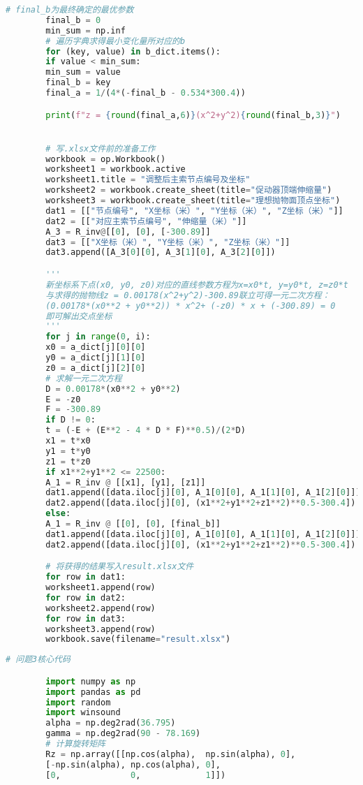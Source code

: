 \documentclass{myclass}
\begin{document}
\begin{appendices}
\begin{lstlisting}[language={python}]
		# final_b为最终确定的最优参数
		final_b = 0
		min_sum = np.inf
		# 遍历字典求得最小变化量所对应的b
		for (key, value) in b_dict.items():
		if value < min_sum:
		min_sum = value
		final_b = key
		final_a = 1/(4*(-final_b - 0.534*300.4))

		print(f"z = {round(final_a,6)}(x^2+y^2){round(final_b,3)}")


		# 写.xlsx文件前的准备工作
		workbook = op.Workbook()
		worksheet1 = workbook.active
		worksheet1.title = "调整后主索节点编号及坐标"
		worksheet2 = workbook.create_sheet(title="促动器顶端伸缩量")
		worksheet3 = workbook.create_sheet(title="理想抛物面顶点坐标")
		dat1 = [["节点编号", "X坐标（米）", "Y坐标（米）", "Z坐标（米）"]]
		dat2 = [["对应主索节点编号", "伸缩量（米）"]]
		A_3 = R_inv@[[0], [0], [-300.89]]
		dat3 = [["X坐标（米）", "Y坐标（米）", "Z坐标（米）"]]
		dat3.append([A_3[0][0], A_3[1][0], A_3[2][0]])

		'''
		新坐标系下点(x0, y0, z0)对应的直线参数方程为x=x0*t, y=y0*t, z=z0*t
		与求得的抛物线z = 0.00178(x^2+y^2)-300.89联立可得一元二次方程：
		(0.00178*(x0**2 + y0**2)) * x^2+ (-z0) * x + (-300.89) = 0
		即可解出交点坐标
		'''
		for j in range(0, i):
		x0 = a_dict[j][0][0]
		y0 = a_dict[j][1][0]
		z0 = a_dict[j][2][0]
		# 求解一元二次方程
		D = 0.00178*(x0**2 + y0**2)
		E = -z0
		F = -300.89
		if D != 0:
		t = (-E + (E**2 - 4 * D * F)**0.5)/(2*D)
		x1 = t*x0
		y1 = t*y0
		z1 = t*z0
		if x1**2+y1**2 <= 22500:
		A_1 = R_inv @ [[x1], [y1], [z1]]
		dat1.append([data.iloc[j][0], A_1[0][0], A_1[1][0], A_1[2][0]])
		dat2.append([data.iloc[j][0], (x1**2+y1**2+z1**2)**0.5-300.4])
		else:
		A_1 = R_inv @ [[0], [0], [final_b]]
		dat1.append([data.iloc[j][0], A_1[0][0], A_1[1][0], A_1[2][0]])
		dat2.append([data.iloc[j][0], (x1**2+y1**2+z1**2)**0.5-300.4])

		# 将获得的结果写入result.xlsx文件
		for row in dat1:
		worksheet1.append(row)
		for row in dat2:
		worksheet2.append(row)
		for row in dat3:
		worksheet3.append(row)
		workbook.save(filename="result.xlsx")

		\end{lstlisting}  %
		\begin{lstlisting}[language={python}]  
		# 问题3核心代码

		import numpy as np
		import pandas as pd
		import random
		import winsound
		alpha = np.deg2rad(36.795)
		gamma = np.deg2rad(90 - 78.169)
		# 计算旋转矩阵
		Rz = np.array([[np.cos(alpha),  np.sin(alpha), 0],
		[-np.sin(alpha), np.cos(alpha), 0],
		[0,              0,             1]])


\end{lstlisting}
\end{appendices}
\end{document}
